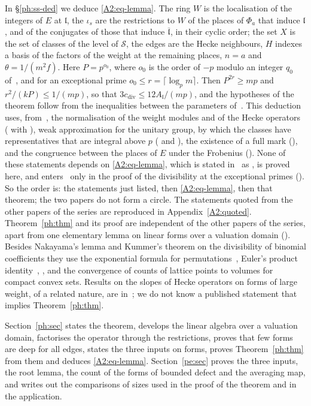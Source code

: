 \documentclass[10pt]{amsart}
\theoremstyle{definition}
\theoremstyle{remark}
\providecommand{\auPa}{\Phi_a}
\providecommand{\auS}{\mathcal S}
\providecommand{\aubar}[1]{\overline{#1}}
\providecommand{\phcd}{c_{\mathrm{div}}}
\begin{document}
In \S\ref{ph:ss-ded} we deduce \eqref{A2:eq-lemma}. The ring $W$ is the localisation of the
integers of $E$ at $\mathfrak l$, the $\iota_s$ are the restrictions to $W$ of the places of
$\auPa$ that induce $\mathfrak l$, and of the conjugates of those that induce
$\aubar{\mathfrak l}$, in their cyclic order; the set $X$ is the set of classes of the level of
$\auS$, the edges are the Hecke neighbours, $H$ indexes a basis of the factors of the weight at
the remaining places, $n=a$ and $\theta=1/(m^2f)$. Here $P=p^{o_0}$, where $o_0$ is the order of $-p$ modulo an integer $q_0$ of~\cite{P46}, and
for an exceptional prime $o_0\le r=\lceil\log_pm\rceil$. Then $P^{2r}\ge mp$ and
$r^2/(kP)\le1/(mp)$, so that $3\phcd\le12A_{\mathfrak l}/(mp)$, and the hypotheses of the theorem
follow from the inequalities between the parameters of~\cite{P46}. This
deduction uses, from~\cite{P49}, the normalisation of the weight modules and of the Hecke
operators ({\cite[\S6.1]{P49}} with {\cite[Remark~6.2]{P49}}), weak approximation for the unitary group, by which the classes
have representatives that are integral above $p$ ({\cite[Proposition~6.3]{P49}} and
{\cite[Corollary~6.4]{P49}}), the existence of a full mark ({\cite[Lemma~4.17]{P49}}), and the congruence between the places of $E$ under the Frobenius
({\cite[Lemma~4.11]{P49}}). None of these statements depends on \eqref{A2:eq-lemma}, which is stated in~\cite{P49} as {\cite[Lemma~4.19]{P49}}, is proved here, and
enters~\cite{P49} only in the proof of the divisibility at the exceptional primes
({\cite[Theorem~4.21(iv)]{P49}}). So the order is: the statements just listed, then \eqref{A2:eq-lemma}, then that theorem; the two papers do not form a circle. The statements quoted from
the other papers of the series are reproduced in Appendix~\ref{A2:quoted}. Theorem~\ref{ph:thm}
and its proof are independent of the other papers of the series, apart from one elementary lemma
on linear forms over a valuation domain ({\cite[Lemma~4.2]{P49}}). Besides Nakayama's lemma and Kummer's theorem on the divisibility of binomial
coefficients they use the exponential formula for permutations~\cite{StanleyEC2}, Euler's product
identity~\cite{AndrewsPartitions}, \cite{Macdonald}, and the convergence of counts of lattice
points to volumes for compact convex sets. Results on the slopes of Hecke operators on forms of
large weight, of a related nature, are in~\cite{LTXZ}; we do not know a published statement that
implies Theorem~\ref{ph:thm}.

Section~\ref{ph:sec} states the theorem, develops the linear algebra over a valuation domain,
factorises the operator through the restrictions, proves that few forms are deep for all edges,
states the three inputs on forms, proves Theorem~\ref{ph:thm} from them and deduces
\eqref{A2:eq-lemma}. Section~\ref{pe:sec} proves the three inputs, the root lemma, the count of
the forms of bounded defect and the averaging map, and writes out the comparisons of sizes used
in the proof of the theorem and in the application.
\end{document}
